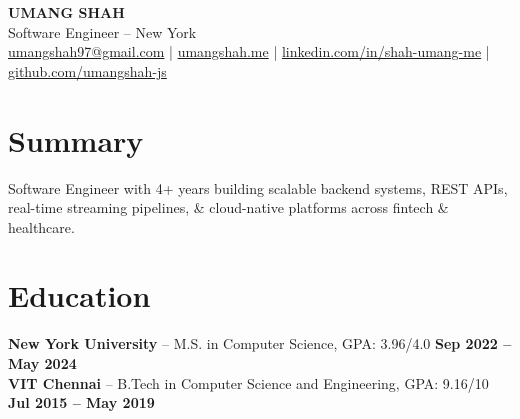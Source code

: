 \documentclass[letterpaper]{article}
\begin{document}
\begin{center}
{\Large \textbf{UMANG SHAH}}\\[-1pt]
Software Engineer -- New York\\[-1pt]
\href{mailto:umangshah97@gmail.com}{umangshah97@gmail.com} \;|\; \href{https://umangshah.me}{umangshah.me} \;|\; \href{https://www.linkedin.com/in/shah-umang-me}{linkedin.com/in/shah-umang-me} \;|\; \href{https://github.com/umangshah-js}{github.com/umangshah-js}
\end{center}

\vspace{-8pt}

\section*{Summary}
Software Engineer with 4+ years building scalable backend systems, REST APIs, real-time streaming pipelines, \& cloud-native platforms across fintech \& healthcare.

\vspace{0pt}

\section*{Education}
\textbf{New York University} -- M.S. in Computer Science, GPA: 3.96/4.0 \hfill \textbf{Sep 2022 -- May 2024} \\
\textbf{VIT Chennai} -- B.Tech in Computer Science and Engineering, GPA: 9.16/10 \hfill \textbf{Jul 2015 -- May 2019}

\vspace{0pt}
\end{document}
